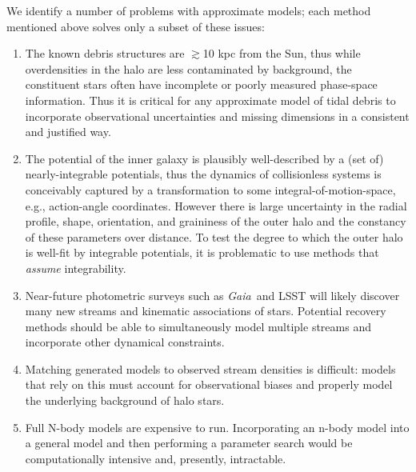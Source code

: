 \documentclass[letterpaper,12pt,preprint]{aastex}
\newcommand{\project}[1]{\textsl{#1}}
\newcommand{\gaia}{\project{Gaia}}
\begin{document}
We identify a number of problems with approximate models; each method  mentioned above solves only a subset of these issues:
\begin{enumerate}
	\item The known debris structures are $\gtrsim$10 kpc from the Sun, thus while overdensities in the halo are less contaminated by background, the constituent stars often have incomplete or poorly measured phase-space information. Thus it is critical for any approximate model of tidal debris to incorporate observational uncertainties and missing dimensions in a consistent and justified way. 
	\item The potential of the inner galaxy is plausibly well-described by a (set of) nearly-integrable potentials, thus the dynamics of collisionless systems is conceivably captured by a transformation to some integral-of-motion-space, e.g., action-angle coordinates. However there is large uncertainty in the radial profile, shape, orientation, and graininess of the outer halo and the constancy of these parameters over distance. To test the degree to which the outer halo is well-fit by integrable potentials, it is problematic to use methods that \emph{assume} integrability. 
	\item Near-future photometric surveys such as \gaia\, and LSST will likely discover many new streams and kinematic associations of stars. Potential recovery methods should be able to simultaneously model multiple streams and incorporate other dynamical constraints.
	\item Matching generated models to observed stream densities is difficult: models that rely on this must account for observational biases and properly model the underlying background of halo stars. 
	\item Full N-body models are expensive to run. Incorporating an n-body model into a general model and then performing a parameter search would be computationally intensive and, presently, intractable. 
\end{enumerate}
\end{document}
